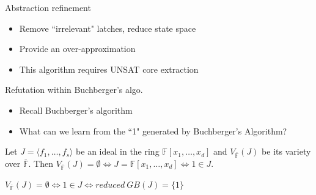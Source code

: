 \documentclass[xcolor=dvipsnames]{beamer}
\newcommand{\bi}{\begin{itemize}}
\newcommand{\ei}{\end{itemize}}
\newcommand{\F}{{\mathbb{F}}}
\begin{document}
\begin{frame}[label = refine]{\large{Abstraction refinement}}
\begin{figure}[hbt]
\end{figure}
\vspace{-0.2in}
\bi
\item Remove ``irrelevant" latches, reduce state space
\item Provide an over-approximation
\item This algorithm requires \alert{UNSAT core extraction}
\ei
\hyperlink{motiv3}{}
\end{frame}
\begin{frame}{\large{Refutation within Buchberger's algo.}}
\bi
\item Recall Buchberger's algorithm
\pause
\item  What can we learn from the \alert{``1" generated by Buchberger's Algorithm}?
\ei
\begin{Theorem}
\label{thm:weak-ns}
Let $J = \langle f_1,\dots, f_s \rangle $ be
an ideal in the ring $ \mathbb{F}[x_1, \dots, x_d]$ and $V_{\overline{\F}}(J)$ be its
variety over $\overline{\F}$. Then $V_{\overline{\F}}(J) = \emptyset \iff J =
\mathbb{F}[x_1,\dots,x_d] \iff 1 \in J$.  
\end{Theorem}
$V_{\overline{\F}}(J)=\emptyset \iff 1\in J \iff reduced~GB(J) = \{1\}$

\end{frame}
\end{document}
